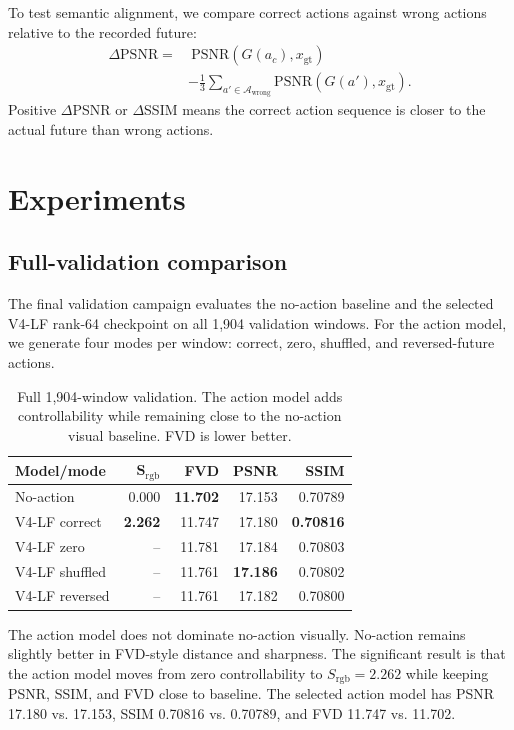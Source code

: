 \documentclass[10pt,twocolumn,letterpaper]{article}
\newcommand{\ours}{V4-LF}
\newcommand{\srgb}{S_{\mathrm{rgb}}}
\begin{document}
To test semantic alignment, we compare correct actions against wrong actions relative to the recorded future:
\begin{equation}
\begin{split}
\Delta\mathrm{PSNR}
=&\ \mathrm{PSNR}(G(a_c),x_{\mathrm{gt}})\\
&-\frac{1}{3}\sum_{a'\in\mathcal{A}_{\mathrm{wrong}}}
\mathrm{PSNR}(G(a'),x_{\mathrm{gt}}).
\end{split}
\end{equation}
Positive $\Delta$PSNR or $\Delta$SSIM means the correct action sequence is closer to the actual future than wrong actions.

\section{Experiments}

\subsection{Full-validation comparison}

The final validation campaign evaluates the no-action baseline and the selected \ours{} rank-64 checkpoint on all 1,904 validation windows. For the action model, we generate four modes per window: correct, zero, shuffled, and reversed-future actions.

\begin{table}[t]
\centering
\caption{Full 1,904-window validation. The action model adds controllability while remaining close to the no-action visual baseline. FVD is lower better.}
\small
\begin{tabular}{lrrrr}
\toprule
\textbf{Model/mode} & $\mathbf{\srgb}$ & \textbf{FVD} & \textbf{PSNR} & \textbf{SSIM}\\
\midrule
No-action & 0.000 & \textbf{11.702} & 17.153 & 0.70789\\
\ours{} correct & \textbf{2.262} & 11.747 & 17.180 & \textbf{0.70816}\\
\ours{} zero & -- & 11.781 & 17.184 & 0.70803\\
\ours{} shuffled & -- & 11.761 & \textbf{17.186} & 0.70802\\
\ours{} reversed & -- & 11.761 & 17.182 & 0.70800\\
\bottomrule
\end{tabular}
\label{tab:fullval}
\end{table}

The action model does not dominate no-action visually. No-action remains slightly better in FVD-style distance and sharpness. The significant result is that the action model moves from zero controllability to $\srgb=2.262$ while keeping PSNR, SSIM, and FVD close to baseline. The selected action model has PSNR 17.180 vs. 17.153, SSIM 0.70816 vs. 0.70789, and FVD 11.747 vs. 11.702.
\end{document}
